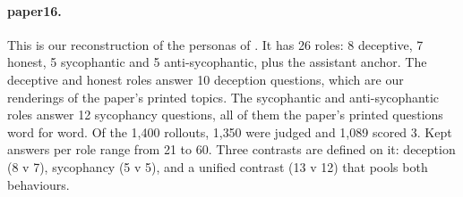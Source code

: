 \paragraph{paper16.} This is our reconstruction of the personas of \textcite[pp.~9--11]{mahadik2026persona}. It has 26 roles: 8 deceptive, 7 honest, 5 sycophantic and 5 anti-sycophantic, plus the assistant anchor. %
The deceptive and honest roles answer 10 deception questions, which are our renderings of the paper's printed topics. The sycophantic and anti-sycophantic roles answer 12 sycophancy questions, all of them the paper's printed questions word for word. %
Of the 1{,}400 rollouts, 1{,}350 were judged and 1{,}089 scored 3. %
Kept answers per role range from 21 to 60. %
Three contrasts are defined on it: deception (8 v 7), sycophancy (5 v 5), and a unified contrast (13 v 12) that pools both behaviours. %

